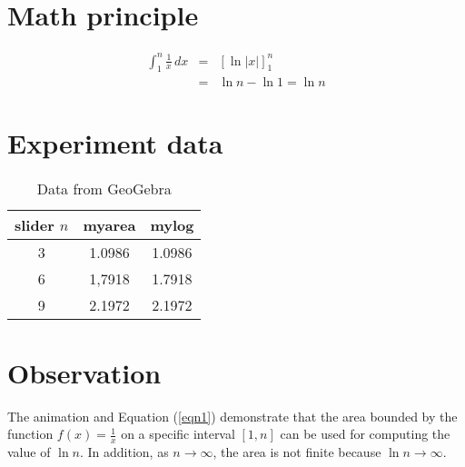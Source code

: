 \documentclass{article}
\begin{document}
\section{Math principle}
\begin{eqnarray}
\int_{1}^{n}\frac{1}{x}\,dx &=& \left[\ln |x|\right]_1^n \nonumber\\
&=& \ln n - \ln 1 = \ln n \label{eqn1}
\end{eqnarray}


\section{Experiment data}
\begin{table}[h]
\centering
\begin{tabular}{|c||c|c|}
\hline
slider $n$ & myarea & mylog \\
\hline
3& 1.0986 & 1.0986 \\
\hline
6& 1,7918 & 1.7918 \\
\hline
9& 2.1972 & 2.1972\\
\hline
\end{tabular}
\caption{Data from GeoGebra}
\end{table}

\section{Observation}

The animation and Equation (\ref{eqn1}) demonstrate that the area bounded by the function $f(x)=\frac{1}{x}$ on a specific interval $[1, n]$ can be used for computing the value of $\ln n.$ In addition, as $n\to\infty$, the area is not finite because $\ln n\rightarrow \infty$.\\
\end{document}
